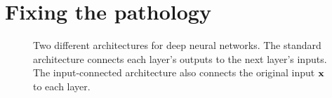\documentclass[twoside]{article}
\newcommand{\sectiondist}{}
\begin{document}





\section{Fixing the pathology}
\sectiondist
\label{sec:fix}

\begin{figure}[h!]

\caption{Two different architectures for deep neural networks.  The standard architecture connects each layer's outputs to the next layer's inputs.  The input-connected architecture also connects the original input ${\bf{x}}$ to each layer.}
\label{fig:input-connected}
\end{figure}
\end{document}

